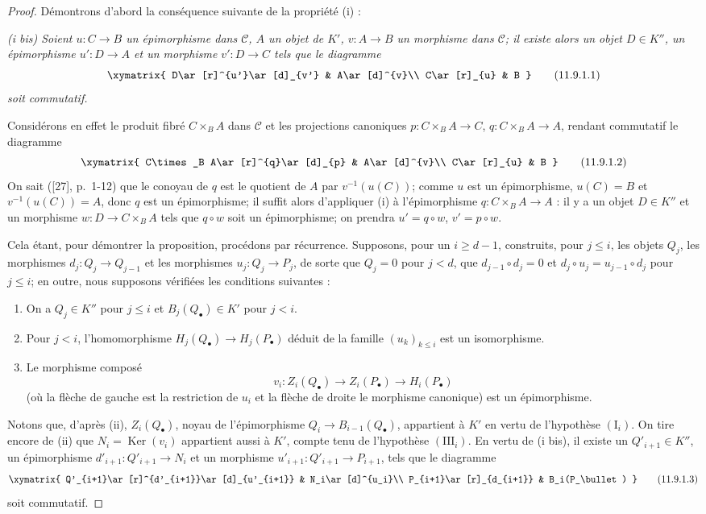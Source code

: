 \begin{proof}
Démontrons d'abord la conséquence suivante de la propriété (i) :

\emph{(i bis) Soient $u:C\to B$ un épimorphisme dans $\mathcal C$, $A$ un
objet de $K'$, $v:A\to B$ un morphisme dans $\mathcal C$; il existe alors un
objet $D\in K''$, un épimorphisme $u':D\to A$ et un morphisme $v':D\to C$
tels que le diagramme}
\[
\xymatrix{
D\ar[r]^{u'}\ar[d]_{v'} & A\ar[d]^{v}\\
C\ar[r]_{u} & B
}
\tag{11.9.1.1}\label{0.11.9.1.1-fr}
\]
\emph{soit commutatif.}

Considérons en effet le produit fibré $C\times_B A$ dans $\mathcal C$ et les
projections canoniques $p:C\times_B A\to C$, $q:C\times_B A\to A$, rendant
commutatif le diagramme
\[
\xymatrix{
C\times_B A\ar[r]^{q}\ar[d]_{p} & A\ar[d]^{v}\\
C\ar[r]_{u} & B
}
\tag{11.9.1.2}\label{0.11.9.1.2-fr}
\]
On sait ([27], p.~1-12) que le conoyau de $q$ est le quotient de $A$ par
$v^{-1}(u(C))$; comme $u$ est un épimorphisme, $u(C)=B$ et
$v^{-1}(u(C))=A$, donc $q$ est un épimorphisme; il suffit alors d'appliquer
(i) à l'épimorphisme $q:C\times_B A\to A$ : il y a un objet $D\in K''$ et un
morphisme $w:D\to C\times_B A$ tels que $q\circ w$ soit un épimorphisme; on
prendra $u'=q\circ w$, $v'=p\circ w$.

Cela étant, pour démontrer la proposition, procédons par récurrence.
Supposons, pour un $i\geq d-1$, construits, pour $j\leq i$, les objets $Q_j$,
les morphismes $d_j:Q_j\to Q_{j-1}$ et les morphismes $u_j:Q_j\to P_j$, de
sorte que $Q_j=0$ pour $j<d$, que $d_{j-1}\circ d_j=0$ et
$d_j\circ u_j=u_{j-1}\circ d_j$ pour $j\leq i$; en outre, nous supposons
vérifiées les conditions suivantes :
\begin{enumerate}
\item[$(\mathrm I_i)$] On a $Q_j\in K''$ pour $j\leq i$ et
$B_j(Q_\bullet)\in K'$ pour $j<i$.
\item[$(\mathrm{II}_i)$] Pour $j<i$, l'homomorphisme
$H_j(Q_\bullet)\to H_j(P_\bullet)$ déduit de la famille $(u_k)_{k\leq i}$
est un isomorphisme.
\item[$(\mathrm{III}_i)$] Le morphisme composé
\[
v_i:Z_i(Q_\bullet)\longrightarrow Z_i(P_\bullet)
\longrightarrow H_i(P_\bullet)
\]
(où la flèche de gauche est la restriction de $u_i$ et la flèche de droite
le morphisme canonique) est un épimorphisme.
\end{enumerate}
Notons que, d'après (ii), $Z_i(Q_\bullet)$, noyau de l'épimorphisme
$Q_i\to B_{i-1}(Q_\bullet)$, appartient à $K'$ en vertu de l'hypothèse
$(\mathrm I_i)$. On tire encore de (ii) que
$N_i=\operatorname{Ker}(v_i)$ appartient aussi à $K'$, compte tenu de
l'hypothèse $(\mathrm{III}_i)$. En vertu de (i bis), il existe un
$Q'_{i+1}\in K''$, un épimorphisme $d'_{i+1}:Q'_{i+1}\to N_i$ et un
morphisme $u'_{i+1}:Q'_{i+1}\to P_{i+1}$, tels que le diagramme
\[
\xymatrix{
Q'_{i+1}\ar[r]^{d'_{i+1}}\ar[d]_{u'_{i+1}} &
N_i\ar[d]^{u_i}\\
P_{i+1}\ar[r]_{d_{i+1}} & B_i(P_\bullet)
}
\tag{11.9.1.3}\label{0.11.9.1.3-fr}
\]
soit commutatif.


\end{proof}
